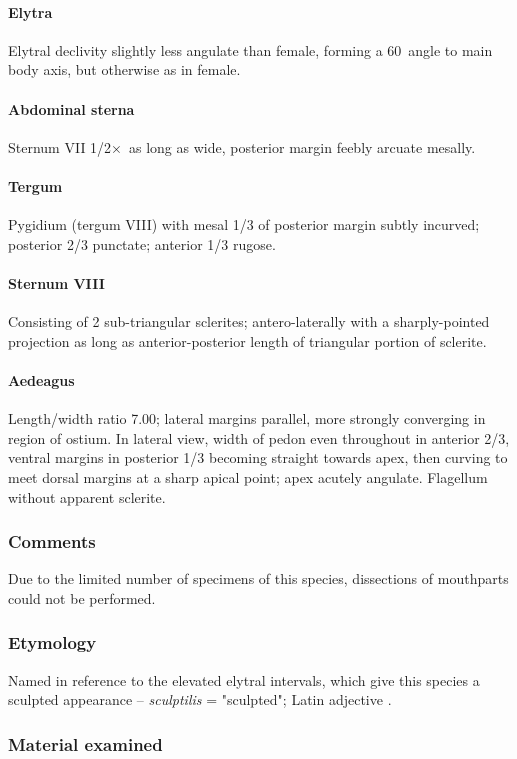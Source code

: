 \documentclass[fleqn,10pt,lineno]{wlpeerj} %
\newcommand{\td}{\textdegree~}
\newcommand{\x}{$\times$~}
\begin{document}
			\paragraph{Elytra}
				Elytral declivity slightly less angulate than female, forming a 60\td angle to main body axis, but otherwise as in female.
			\paragraph{Abdominal sterna}
				Sternum VII 1/2\x as long as wide, posterior margin feebly arcuate mesally.
			\paragraph{Tergum}
				Pygidium (tergum VIII) with mesal 1/3 of posterior margin subtly incurved; posterior 2/3 punctate; anterior 1/3 rugose.
			\paragraph{Sternum VIII}
				Consisting of 2 sub-triangular sclerites; antero-laterally with a sharply-pointed projection as long as anterior-posterior length of triangular portion of sclerite.
			\paragraph{Aedeagus}
				Length/width ratio 7.00; lateral margins parallel, more strongly converging in region of ostium. 
				In lateral view, width of pedon even throughout in anterior 2/3, ventral margins in posterior 1/3 becoming straight towards apex, then curving to meet dorsal margins at a sharp apical point; apex acutely angulate. 
				Flagellum without apparent sclerite.
		\subsubsection*{Comments}
			Due to the limited number of specimens of this species, dissections of mouthparts could not be performed.
		\subsubsection*{Etymology}
			Named in reference to the elevated elytral intervals, which give this species a sculpted appearance -- \textit{sculptilis} = "sculpted"; Latin adjective \citep{brown1956}.
		\subsubsection*{Material examined}
\end{document}
